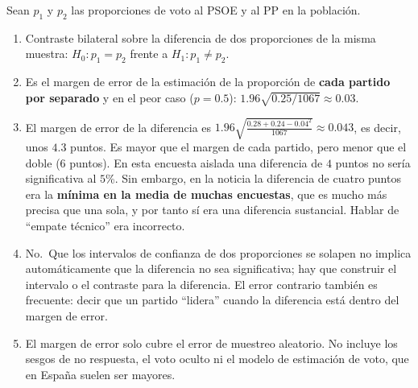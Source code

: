 \documentclass[
  spanish,
  a4paper,
]{scrreport}
\theoremstyle{definition}
\theoremstyle{remark}
\begin{document}
\begin{tcolorbox}[enhanced jigsaw, arc=.35mm, bottomrule=.15mm, bottomtitle=1mm, breakable, colback=white, colbacktitle=quarto-callout-tip-color!10!white, colframe=quarto-callout-tip-color-frame, coltitle=black, left=2mm, leftrule=.75mm, opacityback=0, opacitybacktitle=0.6, rightrule=.15mm, title=\textcolor{quarto-callout-tip-color}{\faLightbulb}\hspace{0.5em}{Solución}, titlerule=0mm, toprule=.15mm, toptitle=1mm]

Sean \(p_1\) y \(p_2\) las proporciones de voto al PSOE y al PP en la
población.

\begin{enumerate}
\def\labelenumi{\alph{enumi}.}
\item
  Contraste bilateral sobre la diferencia de dos proporciones de la
  misma muestra: \(H_0: p_1=p_2\) frente a \(H_1: p_1\neq p_2\).
\item
  Es el margen de error de la estimación de la proporción de
  \textbf{cada partido por separado} y en el peor caso (\(p=0.5\)):
  \(1.96\sqrt{0.25/1067}\approx 0.03\).
\item
  El margen de error de la diferencia es
  \(1.96\sqrt{\frac{0.28+0.24-0.04^2}{1067}}\approx 0.043\), es decir,
  unos \(4.3\) puntos. Es mayor que el margen de cada partido, pero
  menor que el doble (\(6\) puntos). En esta encuesta aislada una
  diferencia de \(4\) puntos no sería significativa al \(5\)\%. Sin
  embargo, en la noticia la diferencia de cuatro puntos era la
  \textbf{mínima en la media de muchas encuestas}, que es mucho más
  precisa que una sola, y por tanto sí era una diferencia sustancial.
  Hablar de ``empate técnico'' era incorrecto.
\item
  No.~Que los intervalos de confianza de dos proporciones se solapen no
  implica automáticamente que la diferencia no sea significativa; hay
  que construir el intervalo o el contraste para la diferencia. El error
  contrario también es frecuente: decir que un partido ``lidera'' cuando
  la diferencia está dentro del margen de error.
\item
  El margen de error solo cubre el error de muestreo aleatorio. No
  incluye los sesgos de no respuesta, el voto oculto ni el modelo de
  estimación de voto, que en España suelen ser mayores.
\end{enumerate}

\end{tcolorbox}
\end{document}

